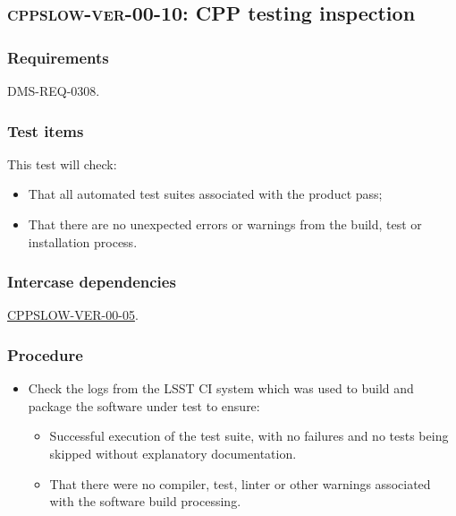 \subsection{\textsc{cppslow-ver-00-10}: CPP testing inspection}
\label{cppslow-ver-00-10}

\subsubsection{Requirements}

DMS-REQ-0308.

\subsubsection{Test items}

This test will check:

\begin{itemize}

  \item{That all automated test suites associated with the product pass;}
  \item{That there are no unexpected errors or warnings from the build, test
  or installation process.}

\end{itemize}

\subsubsection{Intercase dependencies}

\hyperref[cppslow-ver-00-05]{CPPSLOW-VER-00-05}.

\subsubsection{Procedure}

\begin{itemize}

  \item{Check the logs from the LSST CI system which was used to build and
  package the software under test to ensure:

    \begin{itemize}

      \item{Successful execution of the test suite, with no failures and no
      tests being skipped without explanatory documentation.}

      \item{That there were no compiler, test, linter or other warnings
      associated with the software build processing.}

    \end{itemize}
  }

\end{itemize}
